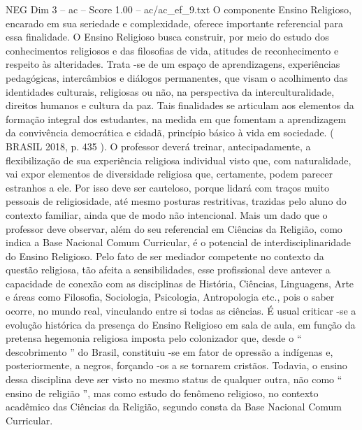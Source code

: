 \begin{textsample}{NEG Dim 3 – ac – Score 1.00 – ac/ac\_ef\_9.txt}
O componente Ensino Religioso, encarado em sua seriedade e complexidade, oferece importante referencial para essa finalidade.
O Ensino Religioso busca construir, por meio do estudo dos conhecimentos religiosos e das filosofias de vida, atitudes de reconhecimento e respeito às alteridades.
Trata -se de um espaço de aprendizagens, experiências pedagógicas, intercâmbios e diálogos permanentes, que visam o acolhimento das identidades culturais, religiosas ou não, na perspectiva da interculturalidade, direitos humanos e cultura da paz.
Tais finalidades se articulam aos elementos da formação integral dos estudantes, na medida em que fomentam a aprendizagem da convivência democrática e cidadã, princípio básico à vida em sociedade. ( BRASIL 2018, p. 435 ).
O professor deverá treinar, antecipadamente, a flexibilização de sua experiência religiosa individual visto que, com naturalidade, vai expor elementos de diversidade religiosa que, certamente, podem parecer estranhos a ele.
Por isso deve ser cauteloso, porque lidará com traços muito pessoais de religiosidade, até mesmo posturas restritivas, trazidas pelo aluno do contexto familiar, ainda que de modo não intencional.
Mais um dado que o professor deve observar, além do seu referencial em Ciências da Religião, como indica a Base Nacional Comum Curricular, é o potencial de interdisciplinaridade do Ensino Religioso.
Pelo fato de ser mediador competente no contexto da questão religiosa, tão afeita a sensibilidades, esse profissional deve antever a capacidade de conexão com as disciplinas de História, Ciências, Linguagens, Arte e áreas como Filosofia, Sociologia, Psicologia, Antropologia etc., pois o saber ocorre, no mundo real, vinculando entre si todas as ciências.
É usual criticar -se a evolução histórica da presença do Ensino Religioso em sala de aula, em função da pretensa hegemonia religiosa imposta pelo colonizador que, desde o “ descobrimento ” do Brasil, constituiu -se em fator de opressão a indígenas e, posteriormente, a negros, forçando -os a se tornarem cristãos.
Todavia, o ensino dessa disciplina deve ser visto no mesmo status de qualquer outra, não como “ ensino de religião ”, mas como estudo do fenômeno religioso, no contexto acadêmico das Ciências da Religião, segundo consta da Base Nacional Comum Curricular.

\end{textsample}
